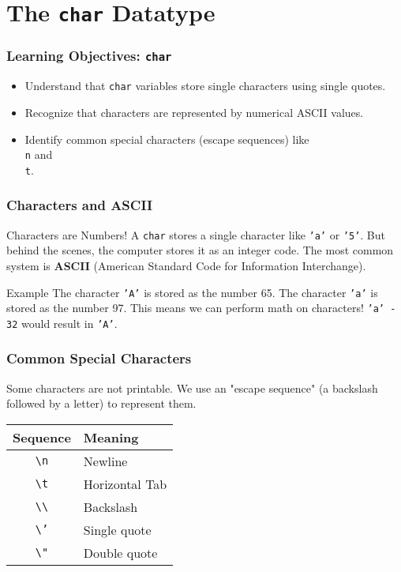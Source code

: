 \documentclass{beamer}
\begin{document}
\section{The \texttt{char} Datatype}

\begin{frame}
\frametitle{Learning Objectives: \texttt{char}}
\begin{itemize}
    \item Understand that \texttt{char} variables store single characters using single quotes.
    \item Recognize that characters are represented by numerical ASCII values.
    \item Identify common special characters (escape sequences) like \texttt{\\n} and \texttt{\\t}.
\end{itemize}
\end{frame}

\begin{frame}
\frametitle{Characters and ASCII}
\begin{alertblock}{Characters are Numbers!}
A \texttt{char} stores a single character like \texttt{'a'} or \texttt{'5'}. But behind the scenes, the computer stores it as an integer code. The most common system is \textbf{ASCII} (American Standard Code for Information Interchange).
\end{alertblock}
\begin{exampleblock}{Example}
The character \texttt{'A'} is stored as the number 65.
\newline
The character \texttt{'a'} is stored as the number 97.
\newline
This means we can perform math on characters! \texttt{'a' - 32} would result in \texttt{'A'}.
\end{exampleblock}
\end{frame}

\begin{frame}
\frametitle{Common Special Characters}
Some characters are not printable. We use an "escape sequence" (a backslash followed by a letter) to represent them.
\begin{center}
\begin{tabular}{|c|l|}
\hline
\textbf{Sequence} & \textbf{Meaning} \\ \hline
\texttt{\textbackslash n} & Newline \\
\texttt{\textbackslash t} & Horizontal Tab \\
\texttt{\textbackslash\textbackslash} & Backslash \\
\texttt{\textbackslash'} & Single quote \\
\texttt{\textbackslash"} & Double quote \\ \hline
\end{tabular}
\end{center}
\end{frame}
\end{document}
